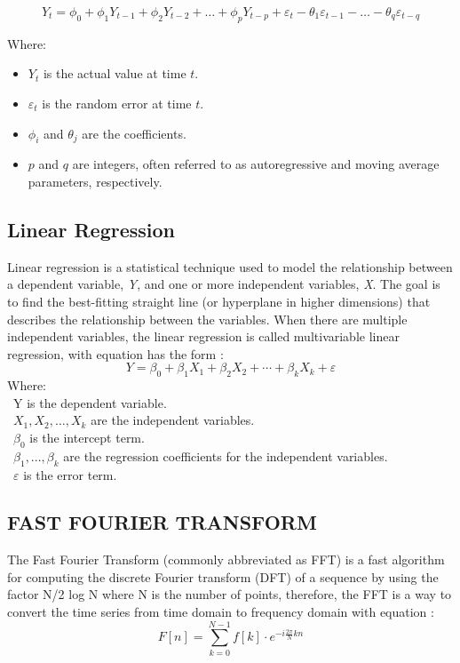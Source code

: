 \documentclass{ieeeojies}
\begin{document}
\begin{equation*}
Y_t = \phi_0 + \phi_1 Y_{t-1} + \phi_2 Y_{t-2} + \ldots + \phi_p Y_{t-p} + \varepsilon_t - \theta_1 \varepsilon_{t-1} - \ldots - \theta_q \varepsilon_{t-q}
\end{equation*}

Where:
\begin{itemize}
    \item $Y_t$ is the actual value at time $t$.
    \item $\varepsilon_t$ is the random error at time $t$.
    \item $\phi_i$ and $\theta_j$ are the coefficients.
    \item $p$ and $q$ are integers, often referred to as autoregressive and moving average parameters, respectively.
\end{itemize}

\subsection{Linear Regression}
Linear regression is a statistical technique used to model the relationship between a dependent variable, \textit{Y}, and one or more independent variables, \textit{X}. The goal is to find the best-fitting straight line (or hyperplane in higher dimensions) that describes the relationship between the variables. 
When there are multiple independent variables, the linear regression is called multivariable linear regression, with equation has the form \cite{busin}:
 \[Y=\beta_0+\beta_1X_1+\beta_2X_2+\cdots+\beta_kX_k+\varepsilon\]
Where:\\
	\indent\textbullet\ Y is the dependent variable.\\
	\indent\textbullet\ \(X_1, X_2, \ldots, X_k\) are the independent variables.\\
	\indent\textbullet\ \(\beta_0\) is the intercept term.\\
	\indent\textbullet\ \(\beta_1,..., \beta_k\) are the regression coefficients for the independent variables.\\
	\indent\textbullet\ \(\varepsilon\) is the error term.

\subsection{FAST FOURIER TRANSFORM}
The Fast Fourier Transform (commonly abbreviated as
FFT) is a fast algorithm for computing the discrete Fourier
transform (DFT) of a sequence \cite{Gillian} by using the factor N/2
log N where N is the number of points, therefore, the FFT is a
way to convert the time series from time domain to frequency
domain \cite{Musbah} with equation \cite{Roberts}: 
\[
F[n] = \sum_{k=0}^{N-1} f[k] \cdot e^{-i \frac{2\pi}{N} kn}
\]
\end{document}
